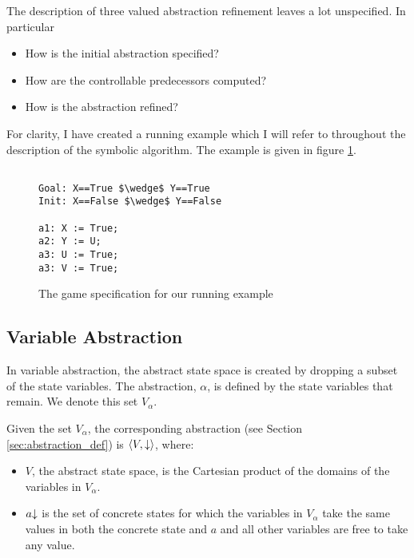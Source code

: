 The description of three valued abstraction refinement leaves a lot unspecified. In particular

\begin{itemize}
    \item How is the initial abstraction specified?
    \item How are the controllable predecessors computed?
    \item How is the abstraction refined?
\end{itemize}

For clarity, I have created a running example which I will refer to throughout the description of the symbolic algorithm. The example is given in figure \ref{fig:running_example}.

\lstset{
    numbers=left,
    frame=single
}

\begin{figure}
    \begin{lstlisting}[mathescape]

Goal: X==True $\wedge$ Y==True
Init: X==False $\wedge$ Y==False

a1: X := True;
a2: Y := U;
a3: U := True;
a3: V := True;

\end{lstlisting}
\caption{The game specification for our running example}
\label{fig:running_example}
\end{figure}

\subsection{Variable Abstraction}

In variable abstraction, the abstract state space is created by dropping a subset of the state variables. The abstraction, $\alpha$, is defined by the state variables that remain. We denote this set $V_{\alpha}$.

Given the set $V_{\alpha}$, the corresponding abstraction (see Section \ref{sec:abstraction_def}) is $\langle V, \mathord{\downarrow} \rangle$, where:
\begin{itemize}
    \item $V$, the abstract state space, is the Cartesian product of the domains of the variables in $V_{\alpha}$.
    \item $a\mathord{\downarrow}$ is the set of concrete states for which the variables in $V_{\alpha}$ take the same values in both the concrete state and $a$ and all other variables are free to take any value.
\end{itemize}

